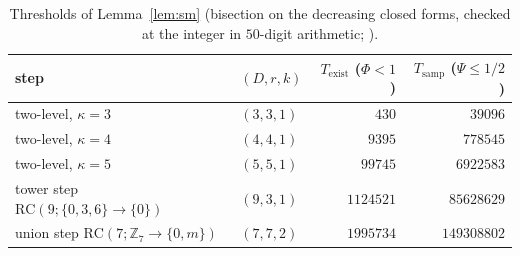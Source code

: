 \begin{table}[ht]
\centering\small
\begin{tabular}{llrr}
\toprule
step & $(D,r,k)$ & $T_{\mathrm{exist}}$ ($\Phi < 1$) & $T_{\mathrm{samp}}$ ($\Psi \le 1/2$)\\
\midrule
two-level, $\kappa = 3$ & $(3,3,1)$ & $430$ & $39096$\\
two-level, $\kappa = 4$ & $(4,4,1)$ & $9395$ & $778545$\\
two-level, $\kappa = 5$ & $(5,5,1)$ & $99745$ & $6922583$\\
tower step $\mathrm{RC}(9;\{0,3,6\}\to\{0\})$ & $(9,3,1)$ & $1124521$ & $85628629$\\
union step $\mathrm{RC}(7;\mathbb{Z}_7\to\{0,m\})$ & $(7,7,2)$ & $1995734$ & $149308802$\\
\bottomrule
\end{tabular}
\caption{Thresholds of Lemma~\ref{lem:sm} (bisection on the decreasing closed forms, checked at the integer in $50$-digit arithmetic; ).}
\label{tab:sm-thresholds}
\end{table}

